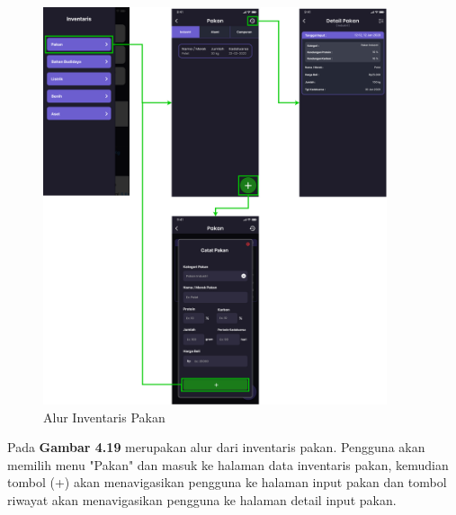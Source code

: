 \begin{spacing}{1.5}
	\begin{figure}[H]
		\centering
		\includegraphics[width=0.9\textwidth]{gambar/sprint2/flow_feed.png}
		\caption{Alur Inventaris Pakan}
	\end{figure}

	Pada \textbf{Gambar 4.19} merupakan alur dari inventaris pakan. Pengguna akan memilih menu "Pakan" dan masuk ke halaman data inventaris pakan, kemudian tombol (+) akan menavigasikan pengguna ke halaman input pakan dan tombol riwayat akan menavigasikan pengguna ke halaman detail input pakan.


\end{spacing}
